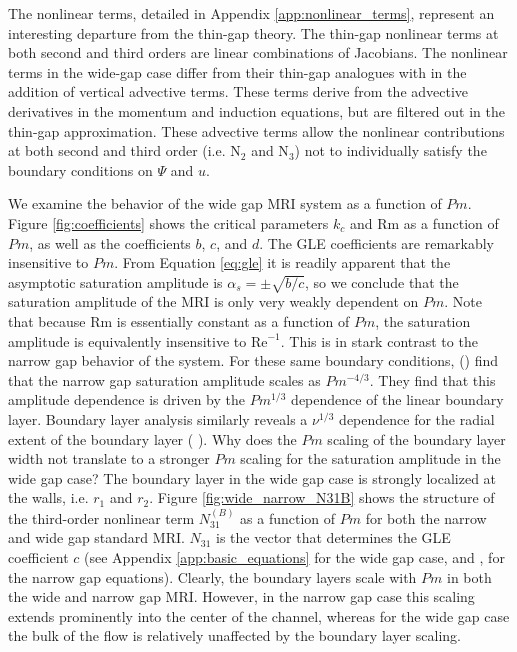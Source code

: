 \documentclass{emulateapj}
\newcommand{\citei}[1]{\citeauthor{#1} \citeyear{#1}}
\newcommand\reye{\mathrm{Re}}
\newcommand\reym{\mathrm{Rm}}
\begin{document}
The nonlinear terms, detailed in Appendix \ref{app:nonlinear_terms}, represent an interesting departure from the thin-gap theory. The thin-gap nonlinear terms at both second and third orders are linear combinations of Jacobians. The nonlinear terms in the wide-gap case differ from their thin-gap analogues with in the addition of vertical advective terms. These terms derive from the advective derivatives in the momentum and induction equations, but are filtered out in the thin-gap approximation. These advective terms allow the nonlinear contributions at both second and third order (i.e. N$_2$ and N$_3$) not to individually satisfy the boundary conditions on $\Psi$ and $u$. %

We examine the behavior of the wide gap MRI system as a function of $Pm$. Figure \ref{fig:coefficients} shows the critical parameters $k_c$ and $\reym$ as a function of $Pm$, as well as the coefficients $b$, $c$, and $d$. The GLE coefficients are remarkably insensitive to $Pm$. From Equation \ref{eq:gle} it is readily apparent that the asymptotic saturation amplitude is $\alpha_{s} = \pm \sqrt{b/c}$, so we conclude that the saturation amplitude of the MRI is only very weakly dependent on $Pm$. Note that because $\reym$ is essentially constant as a function of $Pm$, the saturation amplitude is equivalently insensitive to $\reye^{-1}$. This is in stark contrast to the narrow gap behavior of the system. For these same boundary conditions, \citeauthor{Umurhan:2007hs} (\citeyear{Umurhan:2007hs}) find that the narrow gap saturation amplitude scales as $Pm^{-4/3}$. They find that this amplitude dependence is driven by the $Pm^{1/3}$ dependence of the linear boundary layer. Boundary layer analysis similarly reveals a $\nu^{1/3}$ dependence for the radial extent of the boundary layer (\citei{Goodman:2002ix}). Why does the $Pm$ scaling of the boundary layer width not translate to a stronger $Pm$ scaling for the saturation amplitude in the wide gap case? The boundary layer in the wide gap case is strongly localized at the walls, i.e. $r_1$ and $r_2$. Figure \ref{fig:wide_narrow_N31B} shows the structure of the third-order nonlinear term $N_{31}^{(B)}$ as a function of $Pm$ for both the narrow and wide gap standard MRI. $N_{31}$ is the vector that determines the GLE coefficient $c$ (see Appendix \ref{app:basic_equations} for the wide gap case, and \citei{Umurhan:2007hs}, \citei{Clark:2016} for the narrow gap equations). Clearly, the boundary layers scale with $Pm$ in both the wide and narrow gap MRI. However, in the narrow gap case this scaling extends prominently into the center of the channel, whereas for the wide gap case the bulk of the flow is relatively unaffected by the boundary layer scaling. 
\end{document}
